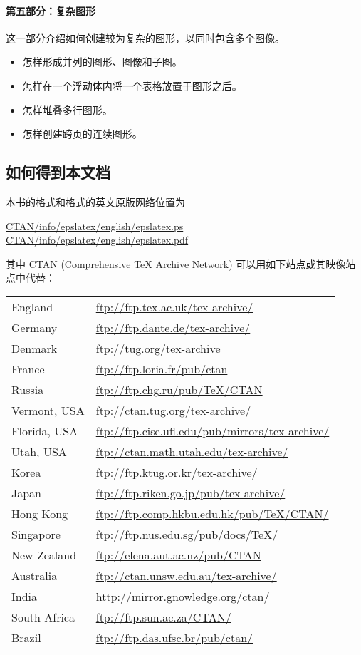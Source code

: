 \paragraph{第五部分：复杂图形}
这一部分介绍如何创建较为复杂的图形，以同时包含多个图像。
\begin{itemize}
	\item 怎样形成并列的图形、图像和子图。
	\item 怎样在一个浮动体内将一个表格放置于图形之后。
	\item 怎样堆叠多行图形。
	\item 怎样创建跨页的连续图形。
\end{itemize}

\subsection*{如何得到本文档}
本书的格式和格式的英文原版网络位置为
\begin{center}
	\href{ftp://ctan.tug.org/tex-archive/info/epslatex/english/epslatex.ps}{CTAN/info/epslatex/english/epslatex.ps}\\
	\href{ftp://ctan.tug.org/tex-archive/info/epslatex/english/epslatex.pdf}{CTAN/info/epslatex/english/epslatex.pdf}
\end{center}
其中 CTAN (Comprehensive \TeX{} Archive Network) 可以用如下站点或其映像站点中代替：
\begin{center}\label{ctan-cite}
	\begin{tabular}{ll}
	England & \url{ftp://ftp.tex.ac.uk/tex-archive/} \\
	Germany & \url{ftp://ftp.dante.de/tex-archive/} \\
	Denmark & \url{ftp://tug.org/tex-archive} \\
	France & \url{ftp://ftp.loria.fr/pub/ctan} \\
	Russia & \url{ftp://ftp.chg.ru/pub/TeX/CTAN} \\
	Vermont, USA & \url{ftp://ctan.tug.org/tex-archive/} \\
	Florida, USA & \url{ftp://ftp.cise.ufl.edu/pub/mirrors/tex-archive/} \\
	Utah, USA & \url{ftp://ctan.math.utah.edu/tex-archive/} \\
	Korea & \url{ftp://ftp.ktug.or.kr/tex-archive/} \\
	Japan & \url{ftp://ftp.riken.go.jp/pub/tex-archive/} \\
	Hong Kong & \url{ftp://ftp.comp.hkbu.edu.hk/pub/TeX/CTAN/} \\
	Singapore & \url{ftp://ftp.nus.edu.sg/pub/docs/TeX/} \\
	New Zealand & \url{ftp://elena.aut.ac.nz/pub/CTAN} \\
	Australia & \url{ftp://ctan.unsw.edu.au/tex-archive/} \\
	India & \url{http://mirror.gnowledge.org/ctan/} \\
	South Africa & \url{ftp://ftp.sun.ac.za/CTAN/} \\
	Brazil & \url{ftp://ftp.das.ufsc.br/pub/ctan/}
	\end{tabular}
\end{center}
